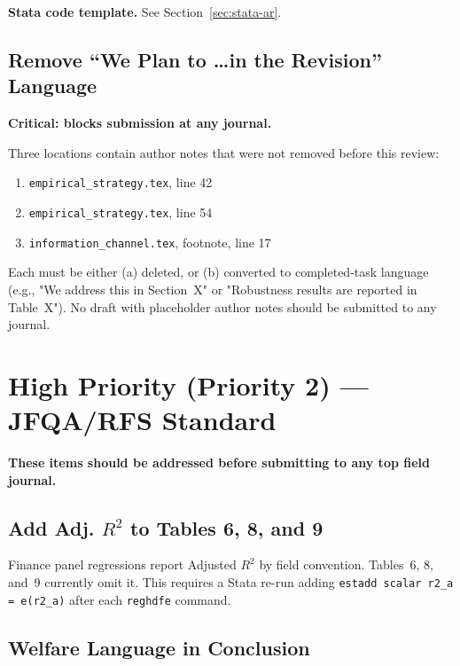 \documentclass[11pt, a4paper]{article}
\begin{document}
\textbf{Stata code template.} See Section~\ref{sec:stata-ar}.

\subsection{Remove ``We Plan to \ldots in the Revision'' Language}

\textcolor{critred}{\textbf{Critical: blocks submission at any journal.}}

Three locations contain author notes that were not removed before this review:

\begin{enumerate}[leftmargin=2em]
  \item \texttt{empirical\_strategy.tex}, line 42
  \item \texttt{empirical\_strategy.tex}, line 54
  \item \texttt{information\_channel.tex}, footnote, line 17
\end{enumerate}

Each must be either (a) deleted, or (b) converted to completed-task language (e.g., "We
address this in Section~X" or "Robustness results are reported in Table~X"). No draft with
placeholder author notes should be submitted to any journal.

\section{High Priority (Priority 2) --- JFQA/RFS Standard}

\textcolor{majblue}{\textbf{These items should be addressed before submitting to any top field journal.}}

\subsection{Add Adj. $R^2$ to Tables 6, 8, and 9}

Finance panel regressions report Adjusted $R^2$ by field convention. Tables~6, 8, and~9 currently omit it. This requires a Stata re-run adding \texttt{estadd scalar r2\_a = e(r2\_a)} after each \texttt{reghdfe} command.

\subsection{Welfare Language in Conclusion}
\end{document}
